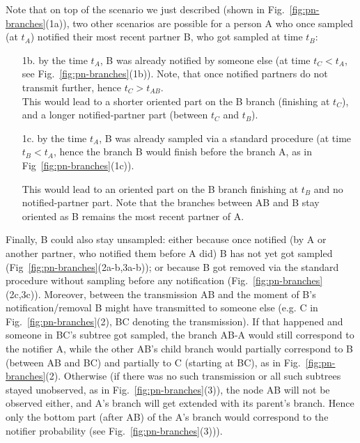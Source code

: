 \documentclass[a4paper,10pt]{article}
\begin{document}
Note that on top of the scenario we just described (shown in Fig.~\ref{fig:pn-branches}(1a)), two other scenarios are possible for a person A who once sampled (at $t_A$) notified their most recent partner B, who got sampled at time $t_B$:
\begin{enumerate}

\item[1b.] by the time $t_A$, B was already notified by someone else (at time $t_C < t_A$, see Fig.~\ref{fig:pn-branches}(1b)).
Note, that once notified partners do not transmit further, hence $t_C > t_{AB}$. \\

This would lead to a shorter oriented part on the B branch (finishing at $t_C$), and a longer notified-partner part (between $t_C$ and $t_B$). 
 

\item[1c.] by the time $t_A$, B was already sampled via a standard procedure (at time $t_B < t_A$, hence the branch B would finish before the branch A, as in Fig~\ref{fig:pn-branches}(1c)).

This would lead to an oriented part on the B branch finishing at $t_B$ and no notified-partner part. Note that the branches between AB and B stay oriented as B remains the most recent partner of A.
\end{enumerate}

Finally, B could also stay unsampled: either because once notified (by A or another partner, who notified them before A did) B has not yet got sampled (Fig~\ref{fig:pn-branches}(2a-b,3a-b)); or because B got removed via the standard procedure without sampling before any notification (Fig.~\ref{fig:pn-branches}(2c,3c)). Moreover, between the transmission AB and the moment of B's notification/removal B might have transmitted to someone else (e.g. C in Fig.~\ref{fig:pn-branches}(2), BC denoting the transmission). If that happened and someone in BC's subtree got sampled, the branch AB-A would still correspond to the notifier A, while the other AB's child branch would partially correspond to B (between AB and BC) and partially to C (starting at BC), as in Fig.~\ref{fig:pn-branches}(2). Otherwise (if there was no such transmission or all such subtrees stayed unobserved, as in Fig.~\ref{fig:pn-branches}(3)), the node AB will not be observed either, and A's branch will get extended with its parent's branch. Hence only the bottom part (after AB) of the A's branch would correspond to the notifier probability (see Fig.~\ref{fig:pn-branches}(3))).
\end{document}
